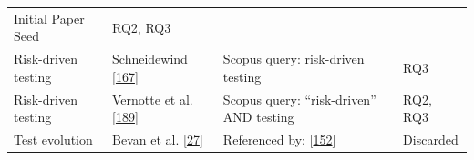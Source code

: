 \documentclass[]{book}
\begin{document}
\begin{longtable}[]{@{}llll@{}}
\begin{minipage}[t]{0.50\columnwidth}
Initial Paper Seed\strut
\end{minipage} & \begin{minipage}[t]{0.04\columnwidth}\raggedright\strut
RQ2, RQ3\strut
\end{minipage}\tabularnewline
\begin{minipage}[t]{0.18\columnwidth}\raggedright\strut
Risk-driven testing\strut
\end{minipage} & \begin{minipage}[t]{0.16\columnwidth}\raggedright\strut
Schneidewind {[}\protect\hyperlink{ref-schneidewind2007}{167}{]}\strut
\end{minipage} & \begin{minipage}[t]{0.50\columnwidth}\raggedright\strut
Scopus query: risk-driven testing\strut
\end{minipage} & \begin{minipage}[t]{0.04\columnwidth}\raggedright\strut
RQ3\strut
\end{minipage}\tabularnewline
\begin{minipage}[t]{0.18\columnwidth}\raggedright\strut
Risk-driven testing\strut
\end{minipage} & \begin{minipage}[t]{0.16\columnwidth}\raggedright\strut
Vernotte et al. {[}\protect\hyperlink{ref-vernotte2015}{189}{]}\strut
\end{minipage} & \begin{minipage}[t]{0.50\columnwidth}\raggedright\strut
Scopus query: ``risk-driven'' AND testing\strut
\end{minipage} & \begin{minipage}[t]{0.04\columnwidth}\raggedright\strut
RQ2, RQ3\strut
\end{minipage}\tabularnewline
\begin{minipage}[t]{0.18\columnwidth}\raggedright\strut
Test evolution\strut
\end{minipage} & \begin{minipage}[t]{0.16\columnwidth}\raggedright\strut
Bevan et al. {[}\protect\hyperlink{ref-bevan2005}{27}{]}\strut
\end{minipage} & \begin{minipage}[t]{0.50\columnwidth}\raggedright\strut
Referenced by:
{[}\protect\hyperlink{ref-pinto2012understanding}{152}{]}\strut
\end{minipage} & \begin{minipage}[t]{0.04\columnwidth}\raggedright\strut
Discarded\strut
\end{minipage}\tabularnewline

\end{longtable}
\end{document}
